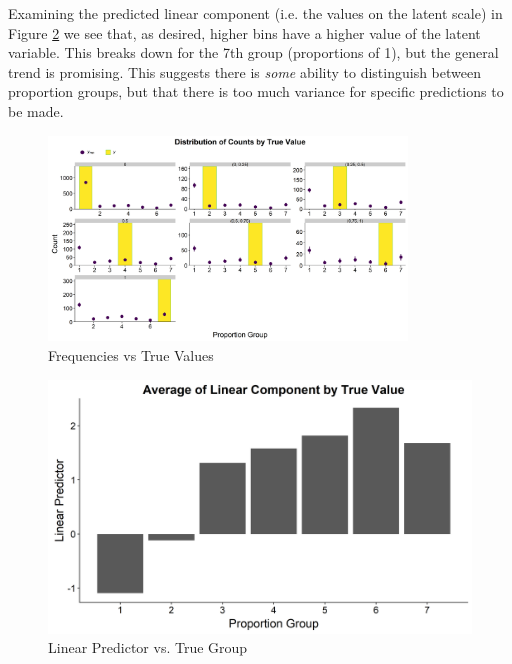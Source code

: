 \documentclass[11pt,twoside]{article}
\numberwithin{Theorem}{section}
\numberwithin{Definition}{section}
\numberwithin{Lemma}{section}
\numberwithin{Algorithm}{section}
\numberwithin{equation}{section}
\begin{document}
Examining the predicted linear component (i.e. the values on the latent scale) in Figure \ref{fig::3_Primary_LinPred} we see that, as desired, higher bins have a higher value of the latent variable. This breaks down for the 7th group (proportions of 1), but the general trend is promising. This suggests there is \textit{some} ability to distinguish between proportion groups, but that there is too much variance for specific predictions to be made. 

\begin{figure}[h!]
	\centering
	\includegraphics[width = 0.85\textwidth, height = 0.35\textheight]{Figures/3_1_Primary_PostPred_BarPred.png}
	\caption{Frequencies vs True Values} \label{fig::3_Predictive_BarPred}	
\end{figure}

\begin{figure}[h!]
	\centering
	\includegraphics[height = 0.3\textheight]{Figures/3_1_Primary_Linpred.png}
	\caption{Linear Predictor vs. True Group} \label{fig::3_Primary_LinPred}	
\end{figure}
\end{document}
